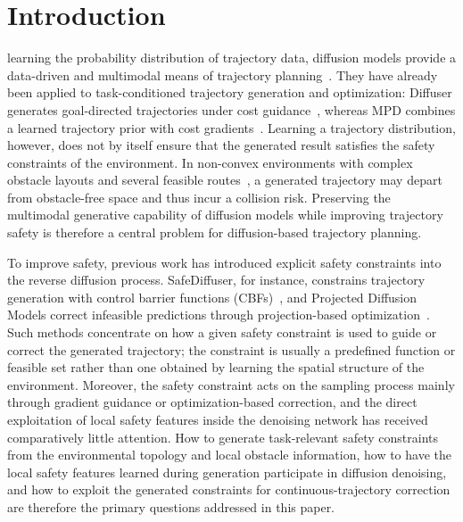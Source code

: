 \documentclass[journal]{IEEEtran}
\begin{document}
\section{Introduction}
 learning the probability distribution of trajectory data,
diffusion models provide a data-driven and multimodal means of trajectory
planning~\cite{ddpm,diffuser,scene}. They have already been applied to task-conditioned trajectory
generation and optimization: Diffuser generates goal-directed trajectories
under cost guidance~\cite{diffuser}, whereas MPD combines a learned trajectory prior with cost
gradients~\cite{mpd}. Learning a trajectory distribution, however, does not by itself
ensure that the generated result satisfies the safety constraints of the
environment. In non-convex environments with complex obstacle layouts and
several feasible routes~\cite{raptor,multimodal}, a generated trajectory may depart from obstacle-free
space and thus incur a collision risk. Preserving the multimodal generative
capability of diffusion models while improving trajectory safety is therefore
a central problem for diffusion-based trajectory planning.

To improve safety, previous work has introduced explicit safety constraints
into the reverse diffusion process. SafeDiffuser, for instance, constrains
trajectory generation with control barrier functions (CBFs)~\cite{safe,cbf}, and Projected
Diffusion Models correct infeasible predictions through projection-based
optimization~\cite{projected}. Such methods concentrate on how a given safety constraint is
used to guide or correct the generated trajectory; the constraint is usually a
predefined function or feasible set rather than one obtained by learning the
spatial structure of the environment. Moreover, the safety constraint acts on
the sampling process mainly through gradient guidance or optimization-based
correction, and the direct exploitation of local safety features inside the
denoising network has received comparatively little attention. How to generate
task-relevant safety constraints from the environmental topology and local
obstacle information, how to have the local safety features learned during
generation participate in diffusion denoising, and how to exploit the generated
constraints for continuous-trajectory correction are therefore the primary
questions addressed in this paper.
\end{document}
